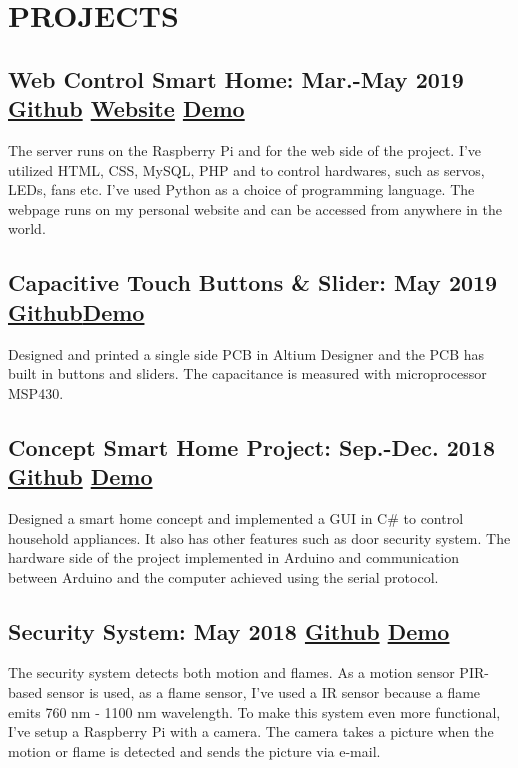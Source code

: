 \documentclass[8pt,twocolumn]{article}
\begin{document}
\section{PROJECTS}




\subsection{Web Control Smart Home: Mar.-May 2019 \textcolor{Mycolor3}{\href{https://github.com/Zrrck/Web-Control-Smart-Home}{\small{Github}}} \textcolor{Mycolor4}{\href{http://webtek.cetinkaya.co}{\small{Website}}}
\textcolor{Mycolor2}{\href{https://youtu.be/G7QD9RP_mmE}{\small{Demo}}}} 
The server runs on the Raspberry Pi and for the web side of the project. I've utilized HTML, CSS, MySQL, PHP and to control
hardwares, such as servos, LEDs, fans etc. I've used Python as a choice of programming language. The webpage runs on my personal website and can be accessed from anywhere in the world.



\subsection{Capacitive Touch Buttons \& Slider: May 2019  
\textcolor{Mycolor3}{\href{https://github.com/Zrrck/Capacitive-Touch-Implementation-}{\small{Github}}}\textcolor{Mycolor2}{\href{https://youtu.be/4U37eLWOmPw} {\small{Demo}}}} 
Designed and printed a single side PCB in Altium Designer and 
the PCB has built in buttons and sliders. The capacitance is measured with microprocessor MSP430.

\subsection{Concept Smart Home Project: Sep.-Dec. 2018 \textcolor{Mycolor3}{\href{https://github.com/Zrrck/Like-a-Smart-Home-but-Not}{\small{Github}}}
\textcolor{Mycolor2}{\href{https://youtu.be/kD4CY6Yt-gg}{\small{Demo}}}}
Designed a smart home concept and implemented a GUI in C\# to control household appliances. It also has other features such as door security system. The hardware side of the project implemented in Arduino and communication between Arduino and the computer achieved using the serial protocol.


\subsection{Security System: May 2018 \textcolor{Mycolor3}{\href{https://github.com/Zrrck/Raspberry-Pi-Fire-Security-System}{\small{Github}}}
\textcolor{Mycolor2}{\href{https://youtu.be/s6VeqZgOBLw}{\small{Demo}}}}
The security system detects both motion and flames. As a motion sensor PIR-based sensor is used, 
as a flame sensor, I've used a IR sensor because a flame emits 760 nm - 1100 nm wavelength. To make this system even more functional, I've setup a Raspberry Pi with a camera. The camera takes a picture when the motion or flame is detected and sends the picture via e-mail.  
\end{document}
